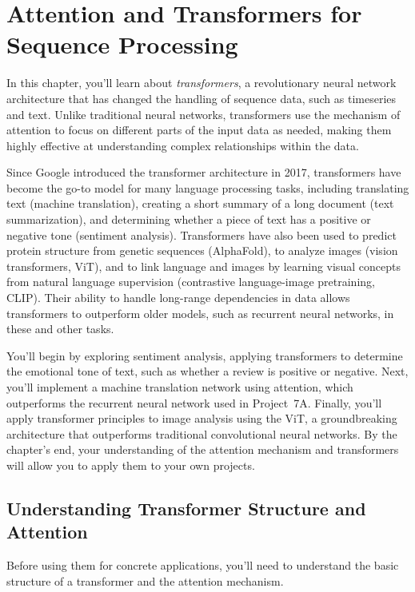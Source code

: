 \chapter[Attention and Transformers for Sequence Processing]{Attention and Transformers for Sequence Processing}\label{ch:08}

In this chapter, you'll learn about \emph{transformers}, a revolutionary neural network architecture that has changed the handling of sequence data, such as timeseries and text. Unlike traditional neural networks, transformers use the mechanism of attention to focus on different parts of the input data as needed, making them highly effective at understanding complex relationships within the data. 

Since Google introduced the transformer architecture in 2017, transformers have become the go-to model for many language processing tasks, including translating text (machine translation), creating a short summary of a long document (text summarization), and determining whether a piece of text has a positive or negative tone (sentiment analysis). Transformers have also been used to predict protein structure from genetic sequences (AlphaFold), to analyze images (vision transformers, ViT), and to link language and images by learning visual concepts from natural language supervision (contrastive language-image pretraining, CLIP). Their ability to handle long-range dependencies in data allows transformers to outperform older models, such as recurrent neural networks, in these and other tasks.

You'll begin by exploring sentiment analysis, applying transformers to determine the emotional tone of text, such as whether a review is positive or negative. Next, you'll implement a machine translation network using attention, which outperforms the recurrent neural network used in Project~7A.
Finally, you'll apply transformer principles to image analysis using the ViT, a groundbreaking architecture that outperforms traditional convolutional neural networks.
By the chapter's end, your understanding of the attention mechanism and transformers will allow you to apply them to your own projects.

\section{Understanding Transformer Structure and Attention}

Before using them for concrete applications, you'll need to understand the basic structure of a transformer and the attention mechanism.

